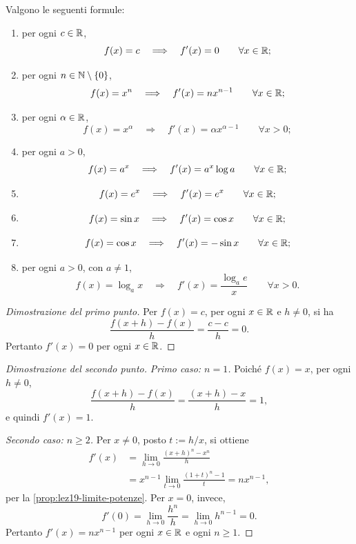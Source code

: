 \begin{proposition}
\label{prop:lez22-derivate-fondamentali}
Valgono le seguenti formule:
\begin{enumerate}
  \item per ogni \(c\in\mathbb{R}\),
  \[
    f(x)=c\quad\Longrightarrow\quad f'(x)=0
    \qquad\forall x\in\mathbb{R};
  \]
  \item per ogni \(n\in\mathbb{N}\setminus\{0\}\),
  \[
    f(x)=x^n\quad\Longrightarrow\quad f'(x)=nx^{n-1}
    \qquad\forall x\in\mathbb{R};
  \]
  \item per ogni \(\alpha\in\mathbb{R}\),
  \[
    f(x)=x^\alpha\quad\Longrightarrow\quad
    f'(x)=\alpha x^{\alpha-1}
    \qquad\forall x>0;
  \]
  \item per ogni \(a>0\),
  \[
    f(x)=a^x\quad\Longrightarrow\quad
    f'(x)=a^x\log a
    \qquad\forall x\in\mathbb{R};
  \]
  \item
  \[
    f(x)=e^x\quad\Longrightarrow\quad f'(x)=e^x
    \qquad\forall x\in\mathbb{R};
  \]
  \item
  \[
    f(x)=\sin x\quad\Longrightarrow\quad
    f'(x)=\cos x
    \qquad\forall x\in\mathbb{R};
  \]
  \item
  \[
    f(x)=\cos x\quad\Longrightarrow\quad
    f'(x)=-\sin x
    \qquad\forall x\in\mathbb{R};
  \]
  \item per ogni \(a>0\), con \(a\ne1\),
  \[
    f(x)=\log_a x\quad\Longrightarrow\quad
    f'(x)=\frac{\log_a e}{x}
    \qquad\forall x>0.
  \]
\end{enumerate}
\end{proposition}

\begin{proof}[Dimostrazione del primo punto]
Per \(f(x)=c\), per ogni \(x\in\mathbb{R}\) e \(h\ne0\),
si ha
\[
  \frac{f(x+h)-f(x)}h=\frac{c-c}{h}=0.
\]
Pertanto \(f'(x)=0\) per ogni \(x\in\mathbb{R}\).
\end{proof}

\begin{proof}[Dimostrazione del secondo punto]
\emph{Primo caso: \(n=1\).}
Poiché \(f(x)=x\), per ogni \(h\ne0\),
\[
  \frac{f(x+h)-f(x)}h=\frac{(x+h)-x}{h}=1,
\]
e quindi \(f'(x)=1\).

\emph{Secondo caso: \(n\ge2\).}
Per \(x\ne0\), posto \(t:=h/x\), si ottiene
\[
\begin{aligned}
  f'(x)
  &=\lim_{h\to0}\frac{(x+h)^n-x^n}{h}\\
  &=x^{n-1}\lim_{t\to0}\frac{(1+t)^n-1}{t}
   =nx^{n-1},
\end{aligned}
\]
per la \cref{prop:lez19-limite-potenze}.
Per \(x=0\), invece,
\[
  f'(0)=\lim_{h\to0}\frac{h^n}{h}
  =\lim_{h\to0}h^{n-1}=0.
\]
Pertanto \(f'(x)=nx^{n-1}\) per ogni \(x\in\mathbb{R}\)
e ogni \(n\ge1\).
\end{proof}

